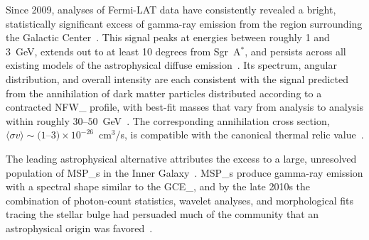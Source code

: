 
Since 2009, analyses of Fermi-LAT data have consistently revealed a bright, statistically significant excess of gamma-ray emission from the region surrounding the Galactic Center~\cite{Goodenough:2009gk,Hooper:2010mq,Daylan:2014rsa,Calore:2014xka}.
This signal peaks at energies between roughly 1 and 3~GeV, extends out to at least 10 degrees from Sgr~A$^*$, and persists across all existing models of the astrophysical diffuse emission~\cite{Calore:2014xka}.
Its spectrum, angular distribution, and overall intensity are each consistent with the signal predicted from the annihilation of dark matter particles distributed according to a contracted \gls{NFW_} profile, with best-fit masses that vary from analysis to analysis within roughly $30$--$50$~GeV~\cite{Daylan:2014rsa,Calore:2014xka,Cirelli:2024ssz}.
The corresponding annihilation cross section, $\langle \sigma v \rangle \sim (1$--$3) \times 10^{-26}$~cm$^3$/s, is compatible with the canonical thermal relic value~\cite{Daylan:2014rsa,Calore:2014xka}.

The leading astrophysical alternative attributes the excess to a large, unresolved population of \glspl{MSP_} in the Inner Galaxy~\cite{Abazajian:2010zy}.
\Glspl{MSP_} produce gamma-ray emission with a spectral shape similar to the \gls{GCE_}, and by the late 2010s the combination of photon-count statistics, wavelet analyses, and morphological fits tracing the stellar bulge had persuaded much of the community that an astrophysical origin was favored~\cite{Lee:2015fea,Bartels:2015aea,Macias:2016nev,Bartels:2017vsx}.

